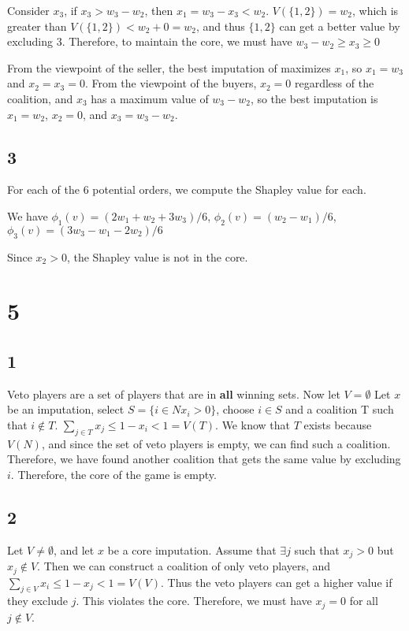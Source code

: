 \documentclass[12pt]{article}
\begin{document}
Consider $x_3$, if $x_3> w_3-w_2$, then $x_1 = w_3-x_3 < w_2$. $V(\{1, 2\}) = w_2$, which is greater than 
$V(\{1, 2\}) < w_2 + 0 = w_2$, and thus $\{1, 2\}$ can get a better value by excluding $3$. Therefore, to maintain the core, we must have
$w_3-w_2 \geq x_3 \geq 0$

From the viewpoint of the seller, the best imputation of maximizes $x_1$, so $x_1 = w_3$ and $x_2 = x_3 = 0$. 
From the viewpoint of the buyers, $x_2=0$ regardless of the coalition, and $x_3$ has a maximum value of $w_3-w_2$, so 
the best imputation is $x_1 = w_2$, $x_2 = 0$, and $x_3 = w_3-w_2$.


\subsection*{3}
For each of the 6 potential orders, we compute the Shapley value for each.

We have $\phi_1(v) = (2w_1+w_2+3w_3)/6$, $\phi_2(v) = (w_2-w_1)/6$,
$\phi_3(v) = (3w_3-w_1-2w_2)/6$

Since $x_2 > 0$, the Shapley value is not in the core.


\newpage
\section*{5}
\subsection*{1}
Veto players are a set of players that are in \textbf{all} winning sets. Now let $V = \emptyset$
Let $x$ be an imputation, select $S=\{i \in N x_i>0\}$, choose $i \in S$ and a 
coalition T such that $i \not\in T$. 
$\sum_{j \in T}x_j \leq 1-x_i < 1 = V(T)$. We know that $T$ exists because $V(N)$, and since the set of 
veto players is empty, we can find such a coalition. Therefore, we have found another coalition that gets the same value 
by excluding $i$. Therefore, the core of the game is empty.

\subsection*{2}
Let $V \neq \emptyset$, and let $x$ be a core imputation. Assume that $\exists j$ such that $x_j > 0$ but $x_j \not \in V$. Then we can construct 
a coalition of only veto players, and $\sum_{j\in V}x_i \leq 1-x_j < 1 = V(V)$. Thus the veto players can get a higher value 
if they exclude $j$. This violates the core. Therefore, we must have $x_j = 0$ for all $j \not\in V$.
\end{document}
